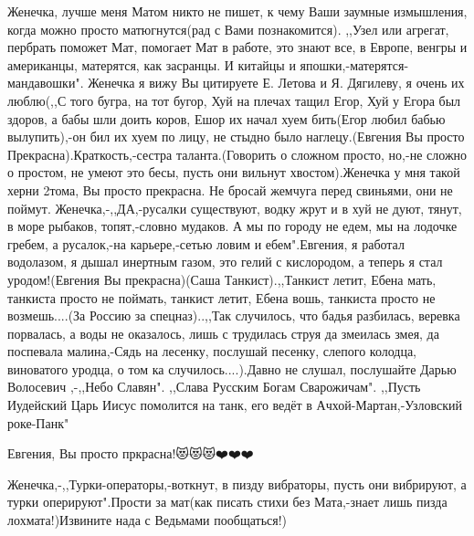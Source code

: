 \begin{itemize}
Женечка, лучше меня Матом никто не пишет, к чему Ваши заумные измышления, когда
можно просто матюгнутся(рад с Вами познакомится). ,,Узел или агрегат, пербрать
поможет Мат, помогает Мат в работе, это знают все, в Европе, венгры и
американцы, матерятся, как засранцы. И китайцы и япошки,-матерятся-мандавошки".
Женечка я вижу Вы цитируете Е. Летова и Я. Дягилеву, я очень их люблю(,,С того
бугра, на тот бугор, Хуй на плечах тащил Егор, Хуй у Егора был здоров, а бабы шли
доить коров, Ешор их начал хуем бить(Егор любил бабью вылупить),-он бил их хуем
по лицу, не стыдно было наглецу.(Евгения Вы просто Прекрасна).Краткость,-сестра
таланта.(Говорить о сложном просто, но,-не сложно о простом, не умеют это
бесы, пусть они вильнут хвостом).Женечка у мня такой херни 2тома, Вы просто
прекрасна. Не бросай жемчуга перед свиньями, они не поймут. Женечка,-,,ДА,-русалки
существуют, водку жрут и в хуй не дуют, тянут, в море рыбаков, топят,-словно
мудаков. А мы по городу не едем, мы на лодочке гребем, а русалок,-на
карьере,-сетью ловим и ебем".Евгения, я работал водолазом, я дышал инертным
газом, это гелий с кислородом, а теперь я стал уродом!(Евгения Вы прекрасна)(Саша
Танкист).,,Танкист летит, Ебена мать, танкиста просто не поймать, танкист
летит, Ебена вошь, танкиста просто не возмешь....(За Россию за спецназ)..,,Так
случилось, что бадья разбилась, веревка порвалась, а воды не оказалось, лишь с
трудилась струя да змеилась змея, да поспевала малина,-Сядь на лесенку, послушай
песенку, слепого колодца, виноватого уродца, о том ка случилось....).Давно не
слушал, послушайте Дарью Волосевич ,-,,Небо Славян". ,,Слава Русским Богам
Сварожичам". ,,Пусть Иудейский Царь Иисус помолится на танк, его ведёт в
Ачхой-Мартан,-Узловский роке-Панк"


 
Евгения, Вы просто пркрасна!😻😻😻❤️❤️❤️

 

Женечка,-,,Турки-операторы,-воткнут, в пизду вибраторы, пусть они вибрируют, а
турки оперируют".Прости за мат(как писать стихи без Мата,-знает лишь пизда
лохмата!)Извините нада с Ведьмами пообщаться!)



\end{itemize}
